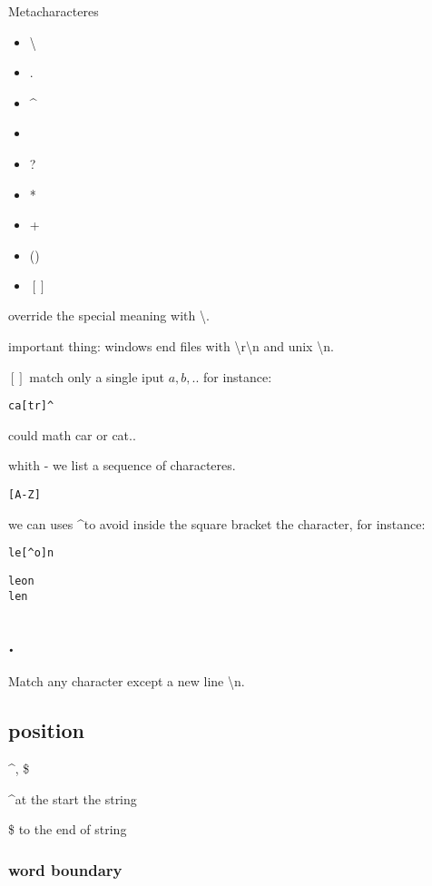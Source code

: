 \documentclass[10pt,a4paper]{article}
\begin{document}
Metacharacteres
\begin{itemize}
\item \textbackslash
\item .
\item \textasciicircum
\item \textbar
\item ?
\item *
\item +
\item ()
\item $[]$
\end{itemize}

override the special meaning with \textbackslash. 

important thing:
windows end files with \textbackslash r\textbackslash n  and unix \textbackslash n.


$[]$ match only a single iput $a,b,..$ for instance:
\begin{verbatim}
ca[tr]^
\end{verbatim}
could math car or cat..


whith - we list a sequence of characteres.

\begin{verbatim}
[A-Z]
\end{verbatim}


we can uses  \textasciicircum to avoid inside the square bracket the character, for instance:
\begin{verbatim}
le[^o]n
\end{verbatim}

\begin{verbatim}
leon
len
\end{verbatim}

\subsection{.}
Match any character except a new line \textbackslash n.


\subsection{position}{ \textasciicircum , \$}


\textasciicircum  at the start the string

\$ to the end of string

\subsubsection{word boundary}
\end{document}
